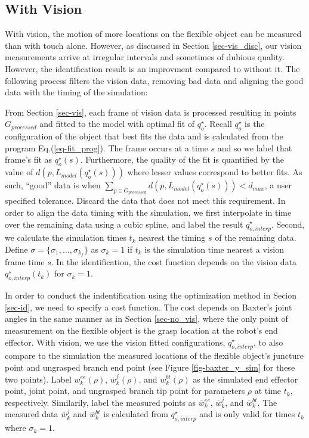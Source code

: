 \documentclass[runningheads,a4paper]{llncs}
\begin{document}
\subsection{With Vision \label{sec-w_vis}}
With vision, the motion of more locations on the flexible object can be measured than with touch alone. However, as discussed in Section \ref{sec-vis_disc}, our vision measurements arrive at irregular intervals and sometimes of dubious quality. However, the identification result is an improvment compared to without it. The following process filters the vision data, removing bad data and aligning the good data with the timing of the simulation:

From Section \ref{sec-vis}, each frame of vision data is processed resulting in points $G_{processed}$ and fitted to the model with optimal fit of $q_o^\star$. Recall $q_o^\star$ is the configuration of the object that best fits the data and is calculated from the program Eq.(\ref{eq-fit_prog}). The frame occurs at a time $s$ and so we label that frame's fit as $q_o^\star(s)$.  Furthermore, the quality of the fit is quantified by the value of $d(p,L_{model}(q_o^\star(s)))$ where lesser values correspond to better fits.  As such, ``good'' data is when $\sum_{p\in G_{processed}}d(p,L_{model}(q_o^\star(s)))<d_{max}$, a user specified tolerance. Discard the data that does not meet this requirement.  In order to align the data timing with the simulation, we first interpolate in time over the remaining data using a cubic spline, and label the result $q_{o,interp}^\star$.  Second, we calculate the simulation times $t_k$ nearest the timing $s$ of the remaining data. Define $\sigma = \{\sigma_1,\ldots,\sigma_{k_f}\}$ as $\sigma_k = 1$ if $t_k$ is the simulation time nearest a vision frame time $s$.  In the identification, the cost function depends on the vision data $q_{o,interp}^\star(t_k)$ for $\sigma_k = 1$.

In order to conduct the indentification using the optimization method in Secion \ref{sec-id}, we need to specify a cost function.  The cost depends on Baxter's joint angles in the same manner as in Section \ref{sec-no_vis}, where the only point of measurement on the flexible object is the grasp location at the robot's end effector. With vision, we use the vision fitted configurations, $q_{o,interp}^\star$, to also compare to the simulation the measured locations of the flexible object's juncture point and ungrasped branch end point (see Figure \ref{fig-baxter_y_sim} for these two points). Label $w_k^{ee}(\rho)$, $w_k^j (\rho)$, and $w_k^{bt}(\rho)$ as the simulated end effector point, joint point, and ungrasped branch tip point for parameters $\rho$ at time $t_k$, respectively. Similarily, label the measured points as $\overline{w}_k^{ee}$, $\overline{w}_k^j$, and $\overline{w}_k^{bt}$. The measured data $\overline{w}_k^{j}$ and $\overline{w}_k^{bt}$ is calculated from $q_{o,interp}^\star$ and is only valid for times $t_k$ where $\sigma_k = 1$.  
\end{document}
